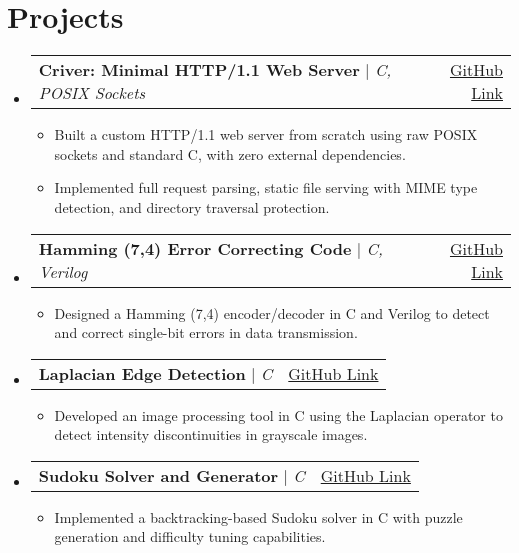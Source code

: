 \documentclass[letterpaper,11pt]{article}
\makeatletter
\newcommand{\resumeItem}[1]{
  \item\small{
    {#1 \vspace{-2pt}}
  }
}
\newcommand{\resumeProjectHeading}[2]{
    \item
    \begin{tabular*}{0.97\textwidth}{l@{\extracolsep{\fill}}r}
      \small#1 & #2 \\
    \end{tabular*}\vspace{-7pt}
}
\newcommand{\resumeSubHeadingListStart}{\begin{itemize}[leftmargin=0.15in, label={}]}
\newcommand{\resumeSubHeadingListEnd}{\end{itemize}}
\newcommand{\resumeItemListStart}{\begin{itemize}}
\newcommand{\resumeItemListEnd}{\end{itemize}\vspace{-5pt}}
\makeatother
\begin{document}
\section{Projects}
  \resumeSubHeadingListStart
    \resumeProjectHeading
        {\textbf{Criver: Minimal HTTP/1.1 Web Server} $|$ \emph{C, POSIX Sockets}}{\href{https://github.com/Aditya-1020/Criver}{GitHub Link}}
        \resumeItemListStart
          \resumeItem{Built a custom HTTP/1.1 web server from scratch using raw POSIX sockets and standard C, with zero external dependencies.}
          \resumeItem{Implemented full request parsing, static file serving with MIME type detection, and directory traversal protection.}
        \resumeItemListEnd
    \resumeProjectHeading
        {\textbf{Hamming (7,4) Error Correcting Code} $|$ \emph{C, Verilog}}{\href{https://github.com/Aditya-1020/Hamming_7-4}{GitHub Link}}
        \resumeItemListStart
          \resumeItem{Designed a Hamming (7,4) encoder/decoder in C and Verilog to detect and correct single-bit errors in data transmission.}
        \resumeItemListEnd
    \resumeProjectHeading
        {\textbf{Laplacian Edge Detection} $|$ \emph{C}}{\href{https://github.com/Aditya-1020/Laplacian-edge}{GitHub Link}}
        \resumeItemListStart
          \resumeItem{Developed an image processing tool in C using the Laplacian operator to detect intensity discontinuities in grayscale images.}
        \resumeItemListEnd
    \resumeProjectHeading
        {\textbf{Sudoku Solver and Generator} $|$ \emph{C}}{\href{https://github.com/Aditya-1020/sudoku_solver}{GitHub Link}}
        \resumeItemListStart
          \resumeItem{Implemented a backtracking-based Sudoku solver in C with puzzle generation and difficulty tuning capabilities.}
        \resumeItemListEnd
  \resumeSubHeadingListEnd
\end{document}
